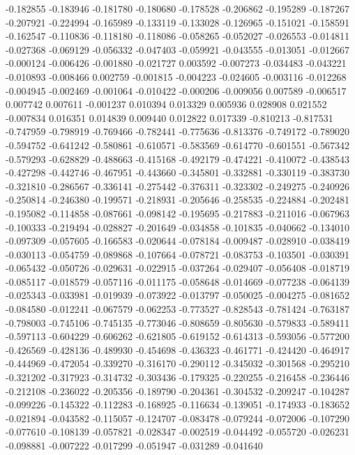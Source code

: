 -0.182855
-0.183946
-0.181780
-0.180680
-0.178528
-0.206862
-0.195289
-0.187267
-0.207921
-0.224994
-0.165989
-0.133119
-0.133028
-0.126965
-0.151021
-0.158591
-0.162547
-0.110836
-0.118180
-0.118086
-0.058265
-0.052027
-0.026553
-0.014811
-0.027368
-0.069129
-0.056332
-0.047403
-0.059921
-0.043555
-0.013051
-0.012667
-0.000124
-0.006426
-0.001880
-0.021727
0.003592
-0.007273
-0.034483
-0.043221
-0.010893
-0.008466
0.002759
-0.001815
-0.004223
-0.024605
-0.003116
-0.012268
-0.004945
-0.002469
-0.001064
-0.010422
-0.000206
-0.009056
0.007589
-0.006517
0.007742
0.007611
-0.001237
0.010394
0.013329
0.005936
0.028908
0.021552
-0.007834
0.016351
0.014839
0.009440
0.012822
0.017339
-0.810213
-0.817531
-0.747959
-0.798919
-0.769466
-0.782441
-0.775636
-0.813376
-0.749172
-0.789020
-0.594752
-0.641242
-0.580861
-0.610571
-0.583569
-0.614770
-0.601551
-0.567342
-0.579293
-0.628829
-0.488663
-0.415168
-0.492179
-0.474221
-0.410072
-0.438543
-0.427298
-0.442746
-0.467951
-0.443660
-0.345801
-0.332881
-0.330119
-0.383730
-0.321810
-0.286567
-0.336141
-0.275442
-0.376311
-0.323302
-0.249275
-0.240926
-0.250814
-0.246380
-0.199571
-0.218931
-0.205646
-0.258535
-0.224884
-0.202481
-0.195082
-0.114858
-0.087661
-0.098142
-0.195695
-0.217883
-0.211016
-0.067963
-0.100333
-0.219494
-0.028827
-0.201649
-0.034858
-0.101835
-0.040662
-0.134010
-0.097309
-0.057605
-0.166583
-0.020644
-0.078184
-0.009487
-0.028910
-0.038419
-0.030113
-0.054759
-0.089868
-0.107664
-0.078721
-0.083753
-0.103501
-0.030391
-0.065432
-0.050726
-0.029631
-0.022915
-0.037264
-0.029407
-0.056408
-0.018719
-0.085117
-0.018579
-0.057116
-0.011175
-0.058648
-0.014669
-0.077238
-0.064139
-0.025343
-0.033981
-0.019939
-0.073922
-0.013797
-0.050025
-0.004275
-0.081652
-0.084580
-0.012241
-0.067579
-0.062253
-0.773527
-0.828543
-0.781424
-0.763187
-0.798003
-0.745106
-0.745135
-0.773046
-0.808659
-0.805630
-0.579833
-0.589411
-0.597113
-0.604229
-0.606262
-0.621805
-0.619152
-0.614313
-0.593056
-0.577200
-0.426569
-0.428136
-0.489930
-0.454698
-0.436323
-0.461771
-0.424420
-0.464917
-0.444969
-0.472054
-0.339270
-0.316170
-0.290112
-0.345032
-0.301568
-0.295210
-0.321202
-0.317923
-0.314732
-0.303436
-0.179325
-0.220255
-0.216458
-0.236446
-0.212108
-0.236022
-0.205356
-0.189790
-0.204361
-0.304532
-0.209247
-0.104287
-0.099226
-0.145322
-0.112283
-0.168925
-0.116634
-0.139051
-0.174933
-0.183652
-0.021894
-0.043582
-0.115057
-0.124707
-0.083478
-0.079244
-0.072006
-0.107290
-0.077610
-0.108139
-0.057821
-0.028347
-0.002519
-0.044492
-0.055720
-0.026231
-0.098881
-0.007222
-0.017299
-0.051947
-0.031289
-0.041640
